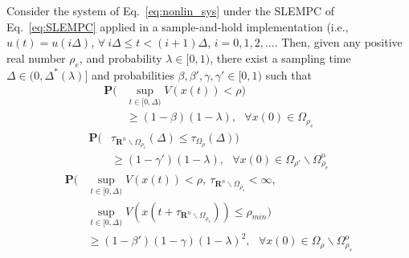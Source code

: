 \documentclass[letterpaper, 10pt, conference]{ieeeconf}
\begin{document}
\begin{thm}\label{thm4}
	Consider the system of Eq.~\ref{eq:nonlin_sys} under the SLEMPC of Eq.~\ref{eq:SLEMPC} applied in a sample-and-hold implementation (i.e., $u(t)=u(i \Delta)$, $\forall ~i \Delta \leq t < (i+1) \Delta$, $i=0,1,2,...$. Then, given any positive real number $\rho_e$, and probability $\lambda \in [0,1)$, there exist a sampling time  $\Delta \in (0,\Delta^*(\lambda)]$ and probabilities $\beta, \beta', \gamma, \gamma' \in [0,1)$ such that
	\begin{equation}\label{eq:mode1_stochastic}
\begin{split}
\mathbf{P}(&\sup \limits_{t \in [0, \Delta)}V(x(t)) < \rho )\\
&\geq (1-\beta)(1- \lambda),~~~\forall x(0) \in \Omega_{\rho_e}
\end{split}	
\end{equation}	
\begin{equation} \label{eq:mode2_stochastic}
\begin{split}
\mathbf{P}( &\tau_{\mathbf{R}^n \backslash \Omega_{\rho_e}}(\Delta) \leq \tau_{\Omega_{\rho}}(\Delta) )\\
&\geq (1-\gamma')(1- \lambda),~~~\forall x(0) \in \Omega_{\rho'} \backslash \Omega_{\rho_e}^{\text{o}} %
\end{split}	
\end{equation}	
\begin{equation}
\label{eq:mode3_stochastic}
\begin{split}
\mathbf{P} (&\sup \limits_{t \in [0, \Delta)} V(x(t)) < \rho,~\tau_{\mathbf{R}^n \backslash \Omega_{\rho_s}} < \infty,\\
&\sup \limits_{t \in [0, \Delta)} V(x(t+\tau_{\mathbf{R}^n \backslash \Omega_{\rho_s}})) \leq \rho_{min})\\
&\geq (1-\beta')(1-\gamma)(1-\lambda)^2,~~~\forall x(0) \in \Omega_{\rho} \backslash \Omega_{\rho_s}^{\text{o}}
\end{split}
\end{equation}


\end{thm}
\end{document}
